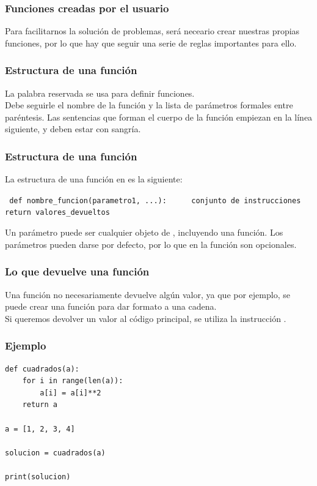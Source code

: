 \documentclass[12pt]{beamer}
\begin{document}
\begin{frame}
\frametitle{Funciones creadas por el usuario}
Para facilitarnos la solución de problemas, será neceario crear nuestras propias funciones, por lo que hay que seguir una serie de reglas importantes para ello.
\end{frame}
\begin{frame}[fragile]
\frametitle{Estructura de una función}
La palabra reservada  se usa para definir funciones. 
\\
\bigskip
\pause
Debe seguirle el nombre de la función y la lista de parámetros formales entre paréntesis. Las sentencias que forman el cuerpo de la función empiezan en la línea siguiente, y deben estar con sangría.
\end{frame}
\begin{frame}[fragile]
\frametitle{Estructura de una función}
La estructura de una función en \python{} es la siguiente:
\begin{center}
\fontsize{12}{12}\selectfont
\begin{exampleblock}{}
\verb| def nombre_funcion(parametro1, ...):|
\verb|     conjunto de instrucciones|
\verb|     return valores_devueltos|
\end{exampleblock}
\end{center}
Un parámetro puede ser cualquier objeto de \python, incluyendo una función. \pause Los parámetros pueden darse por defecto, por lo que en la función son opcionales. 
\end{frame}
\begin{frame}
\frametitle{Lo que devuelve una función}
Una función no necesariamente devuelve algún valor, ya que por ejemplo, se puede crear una función para dar formato a una cadena.
\\
\bigskip
\pause
Si queremos devolver un valor al código principal, se utiliza la instrucción .
\end{frame}
\begin{frame}[fragile]
\frametitle{Ejemplo}
\begin{lstlisting}[caption=Función sencilla,basicstyle=\linespread{1.2}\ttfamily\small, columns=fullflexible,escapeinside=||]
def cuadrados(a):
	for i in range(len(a)):
		a[i] = a[i]**2
    return a

a = [1, 2, 3, 4]

solucion = cuadrados(a)

print(solucion)
\end{lstlisting}
\end{frame}
\end{document}
